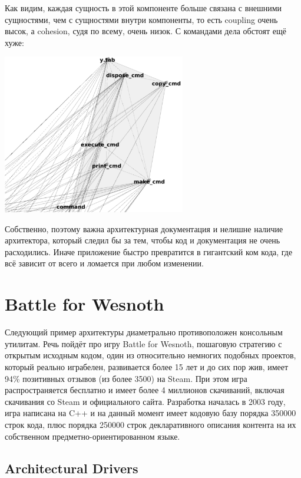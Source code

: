 \documentclass[a5paper]{article}
\begin{document}
Как видим, каждая сущность в этой компоненте больше связана с внешними сущностями, чем с сущностями внутри компоненты, то есть coupling очень высок, а cohesion, судя по всему, очень низок. С командами дела обстоят ещё хуже:

\begin{center}
    \includegraphics[width=0.6\textwidth]{bashCommands.png}
\end{center}

Собственно, поэтому важна архитектурная документация и нелишне наличие архитектора, который следил бы за тем, чтобы код и документация не очень расходились. Иначе приложение быстро превратится в гигантский ком кода, где всё зависит от всего и ломается при любом изменении.

\section{Battle for Wesnoth}

Следующий пример архитектуры диаметрально противоположен консольным утилитам. Речь пойдёт про игру Battle for Wesnoth, пошаговую стратегию с открытым исходным кодом, один из относительно немногих подобных проектов, который реально играбелен, развивается более 15 лет и до сих пор жив, имеет 94\% позитивных отзывов (из более 3500) на Steam. При этом игра распространяется бесплатно и имеет более 4 миллионов скачиваний, включая скачивания со Steam и официального сайта. Разработка началась в 2003 году, игра написана на C++ и на данный момент имеет кодовую базу порядка 350000 строк кода, плюс порядка 250000 строк декларативного описания контента на их собственном предметно-ориентированном языке.

\subsection{Architectural Drivers}
\end{document}
